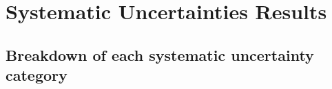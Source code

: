 \chapter{Systematic Uncertainties Results}
\label{Ap:Systematics}
 
\section{Breakdown of each systematic uncertainty category}